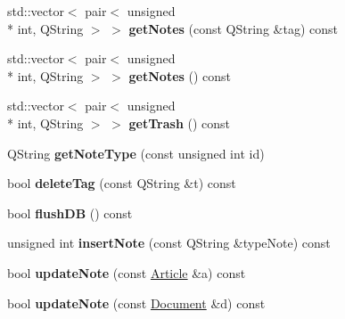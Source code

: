 \begin{DoxyCompactItemize}
\item 
\hypertarget{class_database_manager_a88b8e87fc7edea9188150b03353a2cde}{std\-::vector$<$ pair$<$ unsigned \\*
int, Q\-String $>$ $>$ {\bfseries get\-Notes} (const Q\-String \&tag) const }\label{class_database_manager_a88b8e87fc7edea9188150b03353a2cde}

\item 
\hypertarget{class_database_manager_a8681173f2b3bca5c59aedde06aca2a10}{std\-::vector$<$ pair$<$ unsigned \\*
int, Q\-String $>$ $>$ {\bfseries get\-Notes} () const }\label{class_database_manager_a8681173f2b3bca5c59aedde06aca2a10}

\item 
\hypertarget{class_database_manager_abc00afdcef3da3591755f84ec2b11da5}{std\-::vector$<$ pair$<$ unsigned \\*
int, Q\-String $>$ $>$ {\bfseries get\-Trash} () const }\label{class_database_manager_abc00afdcef3da3591755f84ec2b11da5}

\item 
\hypertarget{class_database_manager_a69b26d837c71bacc9249961e8e6e9f1a}{Q\-String {\bfseries get\-Note\-Type} (const unsigned int id)}\label{class_database_manager_a69b26d837c71bacc9249961e8e6e9f1a}

\item 
\hypertarget{class_database_manager_a392a827d99ce292d1b29f0907ea2f475}{bool {\bfseries delete\-Tag} (const Q\-String \&t) const }\label{class_database_manager_a392a827d99ce292d1b29f0907ea2f475}

\item 
\hypertarget{class_database_manager_ab07cbf4b2209dc23d0182ae5e2c29767}{bool {\bfseries flush\-D\-B} () const }\label{class_database_manager_ab07cbf4b2209dc23d0182ae5e2c29767}

\item 
\hypertarget{class_database_manager_ab4d0e33e24ddba70c03699b88e9fa388}{unsigned int {\bfseries insert\-Note} (const Q\-String \&type\-Note) const }\label{class_database_manager_ab4d0e33e24ddba70c03699b88e9fa388}

\item 
\hypertarget{class_database_manager_a45e88316fb01d63b2efb2f4fd5ffc9a1}{bool {\bfseries update\-Note} (const \hyperlink{class_article}{Article} \&a) const }\label{class_database_manager_a45e88316fb01d63b2efb2f4fd5ffc9a1}

\item 
\hypertarget{class_database_manager_ab5496a11eae6a164047964bea0f6eb64}{bool {\bfseries update\-Note} (const \hyperlink{class_document}{Document} \&d) const }\label{class_database_manager_ab5496a11eae6a164047964bea0f6eb64}


\end{DoxyCompactItemize}
